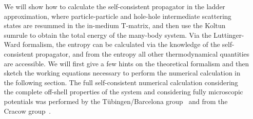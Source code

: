 We will show how to calculate the self-consistent propagator in the ladder approximation, where particle-particle and hole-hole intermediate scattering states are resummed in the in-medium T-matrix, and then use the Koltun sumrule to obtain the total energy of the many-body system. Via the Luttinger-Ward formalism, the entropy can be calculated via the knowledge of the self-consistent propagator, and from the entropy all other thermodynamical quantities are accessible. We will first give a few hints on the theoretical formalism and then sketch the working equations necessary to perform the numerical calculation in the following section. The full self-consistent numerical calculation considering the complete off-shell properties of the system and considering fully microscopic potentials was performed by the T\"ubingen/Barcelona group~\cite{Frick2003,Frick2005,Rios2006C74,Rios2008,Rios2009} and from the Cracow group~\cite{Soma2006,Soma2008,Soma2009}.

